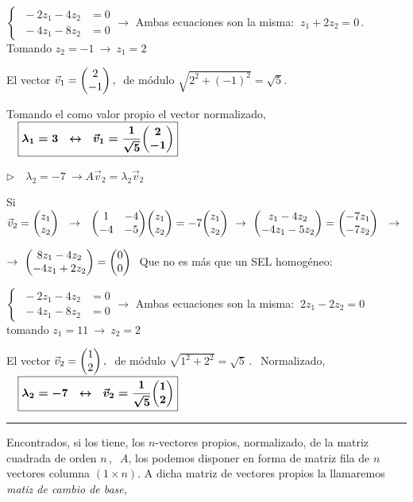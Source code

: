 $\begin{cases} \ -2z_1-4z_2 & =0 \\ \ -4z_1-8z_2 &=0 \end{cases} \to $ Ambas ecuaciones son la misma: $\ z_1+2z_2=0 \, .  \ $ Tomando $z_2=-1 \ \to \ z_1=2$

El vector $\vec v_1=\mqty(2\\-1)\, , \ $ de módulo $\sqrt{2^2+(-1)^2}=\sqrt{5}$. 

Tomando el como valor propio el vector normalizado, 
$\quad \boxed{\boldsymbol{ \lambda_1= 3 \ \ \leftrightarrow \ \  \vec v_1=\dfrac{1}{\sqrt{5}} \mqty(2\\-1)}}$

\vspace{5mm} $\triangleright \quad \boxed{\lambda_2=-7} \ \to A\vec v_2=\lambda_2 \vec v_2$

Si $\vec v_2=\mqty(z_1\\z_2) \ \ \to \ \ \mqty(1&-4\\-4&-5)\mqty(z_1\\z_2)=-7\mqty(z_1\\z_2) \ \to \ \mqty(z_1-4z_2\\-4z_1-5z_2)=\mqty(-7z_1\\-7z_2) \ \ \to \ $

$\to \  \mqty(8z_1-4z_2\\-4z_1+2z_2)=\mqty(0\\0)\ $ Que no es más que un  SEL homogéneo:

$\begin{cases} \ -2z_1-4z_2 & =0 \\ \ -4z_1-8z_2 &=0 \end{cases} \to $ Ambas ecuaciones son la misma: $\ 2z_1-2z_2=0 \, \  $ tomando $z_1=11 \ \to \ z_2=2$

El vector $\vec v_2=\mqty(1\\2)\, , \ $ de módulo $\sqrt{1^2+2^2}=\sqrt{5}\, . \ \ $ Normalizado, 
$\quad \boxed{\boldsymbol{ \lambda_2= -7 \ \ \leftrightarrow \ \  \vec v_2=\dfrac{1}{\sqrt{5}} \mqty(1\\2)}}$

\begin{center}
	\rule{200pt}{0.1pt}
\end{center}

\color{black}
Encontrados, si los tiene, los $n$-vectores propios, normalizado,  de la matriz cuadrada de orden $n\, , \ $ $A$, los podemos disponer en forma de matriz fila de $n$ vectores columna $(1\times n)$. A dicha matriz de vectores propios la llamaremos \emph{matiz de cambio de base}, 

